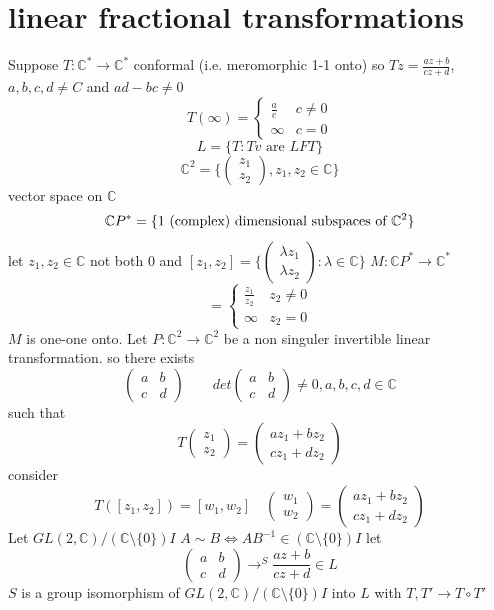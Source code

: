 \documentclass[11pt]{article}
\begin{document}
\section{linear fractional transformations}
Suppose $T : \mathbb{C}^{*} \rightarrow \mathbb{C}^{*}$ conformal (i.e. meromorphic 1-1 onto) so
$Tz = \frac{az+b}{cz + d}$, $a,b,c,d \ne C$ and  $ad - bc \ne 0$
\[
T(\infty) = 
\begin{cases}
    \frac{a}{c} & c \ne 0\\
    \infty & c = 0
\end{cases}
\] 
\[
    L = \{T : Tv \text{ are $LFT$}\}
\] 
\[
    \mathbb{C}^{2} = \{ \begin{pmatrix} z_1 \\ z_2 \end{pmatrix} , z_1,z_2 \in \mathbb{C}\}
\] 
vector space on $ \mathbb{C}$
\[
    \mathbb{C} P^{*} = \{ 1 \text{ (complex) dimensional subspaces of $ \mathbb{C}^{2}$} \}
\] 
let $z_1,z_2 \in \mathbb{C}$ not both $0$ and $[z_1,z_2] = \{ \begin{pmatrix} \lambda z_1 \\ \lambda z_2 \end{pmatrix} : \lambda \in \mathbb{C}\}$
$M : \mathbb{C}P^{*} \rightarrow \mathbb{C}^{*}$ 
\[
= 
\begin{cases}
    \frac{z_1}{z_2}  & z_2 \ne 0\\
    \infty & z_2 = 0
\end{cases}
\] 
$M$ is one-one onto.
Let  $P: \mathbb{C}^2 \rightarrow \mathbb{C}^2$ be a non singuler invertible linear transformation.
so there exists
\[
    \begin{pmatrix} a & b \\ c & d \end{pmatrix} \qquad det \begin{pmatrix}  a & b \\ c & d  \end{pmatrix} \ne 0, a,b,c,d \in \mathbb{C}
\] 
such that
\[
T \begin{pmatrix} z_1 \\ z_2 \end{pmatrix}  = \begin{pmatrix} az_1 + bz_2 \\ cz_1 + d z_2 \end{pmatrix} 
\] 
consider
\[
    T([z_1,z_2]) = [w_1,w_2] \quad \begin{pmatrix} w_1 \\w_2 \end{pmatrix}  = \begin{pmatrix} az_1  + bz_2 \\ cz_1 + dz_2 \end{pmatrix} 
\] 
Let $GL(2, \mathbb{C}) / ( \mathbb{C} \setminus \{0\}) I$ 
$A \sim B \iff AB^{-1} \in ( \mathbb{C} \setminus \{0\}) I$
let 
\[
    \begin{pmatrix} a & b \\c & d \end{pmatrix} \rightarrow^{S} \frac{ az + b}{ cz + d}   \in L
\] 
$S$ is a group isomorphism of   $GL(2, \mathbb{C}) / ( \mathbb{C} \setminus \{0\})I$ into $L$ with  $T,T' \rightarrow T \circ T'$
\end{document}
